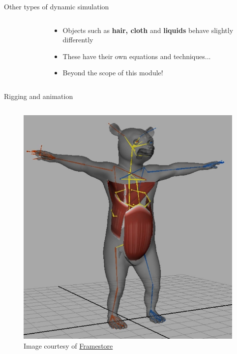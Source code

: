 \begin{frame}{Other types of dynamic simulation}
\begin{columns}
\begin{column}{0.3\textwidth}
\begin{figure}
			\end{figure}
		\end{column}
		\begin{column}{0.65\textwidth}
			\begin{itemize}
				\pause\item Objects such as \textbf{hair, cloth} and \textbf{liquids} behave slightly differently
				\pause\item These have their own equations and techniques...
				\pause\item Beyond the scope of this module!
			\end{itemize}
		\end{column}
	\end{columns}
\end{frame}

\begin{frame}{Rigging and animation}
	\begin{columns}
		\begin{column}{0.3\textwidth}
			\begin{figure}
				\includegraphics[width=\textwidth]{rigging}
				\caption*{Image courtesy of \href{https://www.framestore.com}{Framestore}}
			\end{figure}
		\end{column}

\end{columns}
\end{frame}

